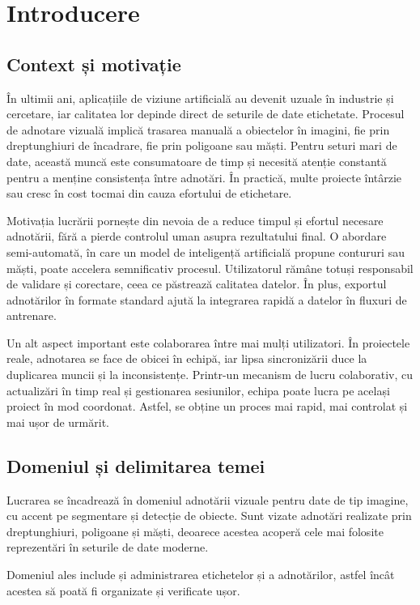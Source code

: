 \chapter{Introducere}\label{ch:intro}
\pagestyle{fancy}

\section{Context și motivație}
În ultimii ani, aplicațiile de viziune artificială au devenit uzuale în industrie și cercetare, iar calitatea lor depinde direct de seturile de date etichetate. Procesul de adnotare vizuală implică trasarea manuală a obiectelor în imagini, fie prin dreptunghiuri de încadrare, fie prin poligoane sau măști. Pentru seturi mari de date, această muncă este consumatoare de timp și necesită atenție constantă pentru a menține consistența între adnotări. În practică, multe proiecte întârzie sau cresc în cost tocmai din cauza efortului de etichetare.

Motivația lucrării pornește din nevoia de a reduce timpul și efortul necesare adnotării, fără a pierde controlul uman asupra rezultatului final. O abordare semi-automată, în care un model de inteligență artificială propune contururi sau măști, poate accelera semnificativ procesul. Utilizatorul rămâne totuși responsabil de validare și corectare, ceea ce păstrează calitatea datelor. În plus, exportul adnotărilor în formate standard ajută la integrarea rapidă a datelor în fluxuri de antrenare.

Un alt aspect important este colaborarea între mai mulți utilizatori. În proiectele reale, adnotarea se face de obicei în echipă, iar lipsa sincronizării duce la duplicarea muncii și la inconsistențe. Printr-un mecanism de lucru colaborativ, cu actualizări în timp real și gestionarea sesiunilor, echipa poate lucra pe același proiect în mod coordonat. Astfel, se obține un proces mai rapid, mai controlat și mai ușor de urmărit.

\section{Domeniul și delimitarea temei}
Lucrarea se încadrează în domeniul adnotării vizuale pentru date de tip imagine, cu accent pe segmentare și detecție de obiecte. Sunt vizate adnotări realizate prin dreptunghiuri, poligoane și măști, deoarece acestea acoperă cele mai folosite reprezentări în seturile de date moderne.

Domeniul ales include și administrarea etichetelor și a adnotărilor, astfel încât acestea să poată fi organizate și verificate ușor.

